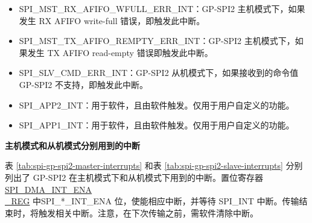 \documentclass[main\_\_CN.tex]{subfiles}
\begin{document}
\begin{itemize}
\item \label{int:SPIMSTRXAFIFOWFULLERRINT}
SPI\_MST\_RX\_AFIFO\_WFULL\_ERR\_INT：GP-SPI2 主机模式下，如果发生 RX AFIFO write-full 错误，即触发此中断。

\item \label{int:SPIMSTTXAFIFOREMPTYERRINT}
SPI\_MST\_TX\_AFIFO\_REMPTY\_ERR\_INT：GP-SPI2 主机模式下，如果发生 TX AFIFO read-empty 错误即触发此中断。

\item \label{int:SPISLVCMDERRINT} SPI\_SLV\_CMD\_ERR\_INT：GP-SPI2 从机模式下，如果接收到的命令值 GP-SPI2 不支持，即触发此中断。

\item \label{int:SPIAPP2INT}SPI\_APP2\_INT：用于软件，且由软件触发。仅用于用户自定义的功能。
\item \label{int:SPIAPP1INT}SPI\_APP1\_INT：用于软件，且由软件触发。仅用于用户自定义的功能。

\end{itemize}

\textbf{主机模式和从机模式分别用到的中断}

表  \ref{tab:spi-gp-spi2-master-interrupts} 和表 \ref{tab:spi-gp-spi2-slave-interrupts} 分别列出了 GP-SPI2 在主机模式下和从机模式下用到的中断。置位寄存器 \hyperref[regdesc:SPIDMAINTENAREG]{SPI\_DMA\_INT\_ENA\\\_REG} 中SPI\_*\_INT\_ENA 位，使能相应中断，并等待 SPI\_INT 中断。传输结束时，将触发相关中断。注意，在下次传输之前，需软件清除中断。
\end{document}
